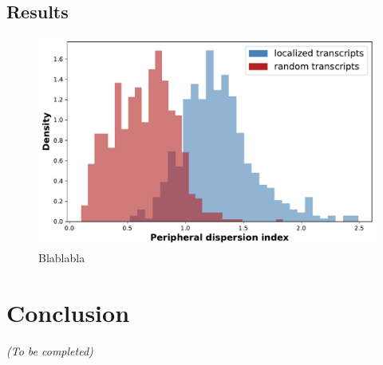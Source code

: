 \subsection{Results}
\label{subsec:results_protrusion}

\begin{figure}[h]
    \centering
    \includegraphics[width=\textwidth]{figures/chapter5/helacentrin_distribution_pdi}
    \caption{Blablabla}
    \label{fig:xavier_pdi}
\end{figure}

\section{Conclusion}
\label{sec:conclusion_chapter5}

\begin{center}
	\textit{(To be completed)}
\end{center}





